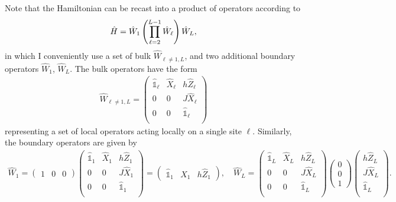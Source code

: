 Note that the Hamiltonian can be recast into a product of operators according to
\begin{align}
    \hat H = \hat W_1\left( \prod_{\ell=2}^{L-1}\hat W_{\ell} \right)\hat W_L,
\end{align}
in which I conveniently use a set of bulk $\hat W_{\ell\neq1,L}$, and two additional boundary operators $\hat W_1$, $\hat W_L$.
The bulk operators have the form
\begin{align}
    \hat W_{\ell\neq1,L} =
    \begin{pmatrix}
        \hat{\mathbb 1}_\ell & \hat X_\ell & h \hat Z_\ell\\
         0 & 0 & J \hat X_\ell\\
        0 & 0 & \hat{\mathbb 1}_\ell\\
    \end{pmatrix}
\end{align}
representing a set of local operators acting locally on a single site $\ell$.
Similarly, the boundary operators are given by
\begin{align}
    \hat W_1 =
    \begin{pmatrix}
        1 & 0 & 0
    \end{pmatrix}
    \begin{pmatrix}
        \hat{\mathbb 1}_1 & \hat X_1 & h \hat Z_1\\
        0 & 0 & J \hat X_1\\
        0 & 0 & \hat{\mathbb 1}_1\\
    \end{pmatrix}
    =
    \begin{pmatrix}
        \hat{\mathbb 1}_1 & \hat X_1 & h \hat Z_1
    \end{pmatrix}
    ,
    \quad
    \hat W_L =
    \begin{pmatrix}
        \hat{\mathbb 1}_L & \hat X_L & h \hat Z_L\\
        0 & 0 & J \hat X_L\\
        0 & 0 & \hat{\mathbb 1}_L\\
    \end{pmatrix}
    \begin{pmatrix}
        0 \\ 0 \\ 1
    \end{pmatrix}
    \begin{pmatrix}
        h \hat Z_L\\
        J \hat X_L\\
        \hat{\mathbb 1}_L\\
    \end{pmatrix}.
    \label{eq:boundary_W}
\end{align}

